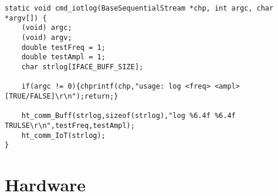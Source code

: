 \documentclass[12pt,]{article}
\begin{document}
	\begin{verbatim}
static void cmd_iotlog(BaseSequentialStream *chp, int argc, char *argv[]) {
	(void) argc;
	(void) argv;
	double testFreq = 1;
	double testAmpl = 1;
	char strlog[IFACE_BUFF_SIZE];
	
	if(argc != 0){chprintf(chp,"usage: log <freq> <ampl> [TRUE/FALSE]\r\n");return;}
	
	ht_comm_Buff(strlog,sizeof(strlog),"log %6.4f %6.4f TRULSE\r\n",testFreq,testAmpl);
	ht_comm_IoT(strlog);
}
	\end{verbatim}

	\newpage
	\section{Hardware}
\end{document}

